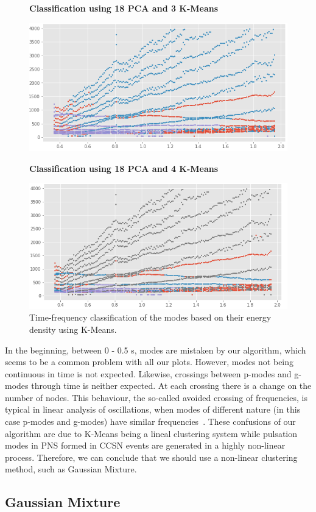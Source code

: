 \documentclass[fleqn,usenatbib]{mnras}
\begin{document}
\begin{figure}[H]
    \centering
        \textbf{Classification using 18 PCA and 3 K-Means}\par\medskip
    \includegraphics[height= 4 cm]{Unknown.png}
    
    
     \textbf{Classification using 18 PCA and 4 K-Means}\par\medskip
    \includegraphics[height= 4 cm]{Unknown1.png}
    \caption{\label{unknown}{Time-frequency classification of the modes based on their energy density using K-Means. } }
\end{figure}
In the beginning, between 0 - 0.5 s, modes are mistaken by our algorithm, which seems to be a common problem with all our plots. However, modes not being continuous in time is not expected. Likewise, crossings between p-modes and g-modes through time is neither expected. At each crossing there is a change on the number of nodes. This behaviour, the so-called avoided crossing of frequencies, is typical in linear analysis of oscillations, when modes of different nature (in this case p-modes and g-modes) have similar frequencies~\cite{towards}. These confusions of our algorithm are due to K-Means being a lineal clustering system while pulsation modes in PNS formed in CCSN events are generated in a highly non-linear process. Therefore, we can conclude that we should use a non-linear clustering method, such as Gaussian Mixture.

\subsection{Gaussian Mixture}
\end{document}

